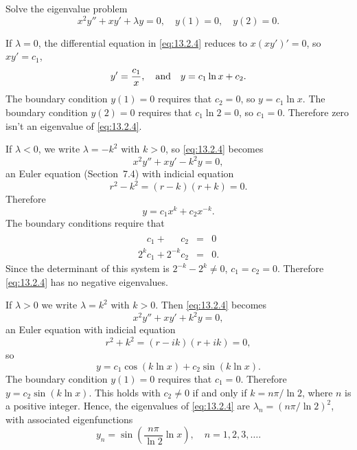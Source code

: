 \setcounter{example}{1}
\setcounter{equation}{3}
\begin{example}
  \label{example:13.2.2} \rm Solve the eigenvalue problem
  \begin{equation}
    \label{eq:13.2.4}x^{2}y''+xy'+\lambda y=0,\quad y(1)=0,\quad y(2)=0.
  \end{equation}
\end{example}
\begin{examplesolution}
\solution If $\lambda=0$, the differential equation in \eqref{eq:13.2.4} reduces to $x(xy')'=0$, so
$xy'=c_{1}$,
\[
  y'=\frac{c_{1}}{x},\text{\quad and\quad}y=c_{1}\ln x+c_{2}.
\]
The boundary condition $y(1)=0$ requires that $c_{2}=0$, so $y=c_{1}\ln x$. The boundary condition
$y(2)=0$ requires that $c_{1}\ln2=0$, so $c_{1}=0$. Therefore zero isn't an eigenvalue of
\eqref{eq:13.2.4}.

If $\lambda<0$, we write $\lambda=-k^{2}$ with $k>0$, so \eqref{eq:13.2.4} becomes
\[
  x^{2}y''+xy'-k^{2}y=0,
\]
an Euler equation (Section~7.4) with indicial equation
\[
  r^{2}-k^{2}=(r-k)(r+k)=0.
\]
Therefore
\[
  y=c_{1}x^{k}+c_{2}x^{-k}.
\]
The boundary conditions require that
\begin{eqnarray*}
  \phantom{2^{k}}c_{1}+\phantom{2^{-k}}c_{2} & = & 0 \\
  2^{k}c_{1}+2^{-k}c_{2}                     & = & 0.
\end{eqnarray*}
Since the determinant of this system is $2^{-k}-2^{k}\ne0$, $c_{1}=c_{2}=0$. Therefore
\eqref{eq:13.2.4} has no negative eigenvalues.

If $\lambda>0$ we write $\lambda=k^{2}$ with $k>0$. Then \eqref{eq:13.2.4} becomes
\[
  x^{2}y''+xy'+k^{2}y=0,
\]
an Euler equation with indicial equation
\[
  r^{2}+k^{2}=(r-ik)(r+ik)=0,
\]
so
\[
  y=c_{1}\cos(k\ln x)+c_{2}\sin(k\ln x).
\]
The boundary condition $y(1)=0$ requires that $c_{1}=0$. Therefore $y=c_{2}\sin(k\ln x)$. This holds
with $c_{2}\ne0$ if and only if $k=n\pi/\ln2$, where $n$ is a positive integer. Hence, the
eigenvalues of \eqref{eq:13.2.4} are $\lambda_{n}=(n\pi/\ln2)^{2}$, with associated eigenfunctions
\[
  y_{n}=\sin\left(\frac{n\pi}{\ln2}\ln x\right),\quad n=1,2,3,\dots.
\]
\end{examplesolution}

